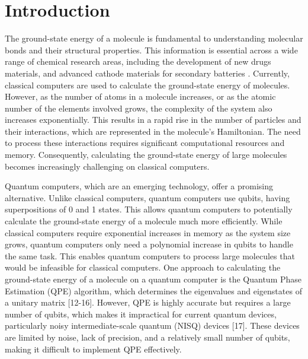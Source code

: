 \documentclass[pdflatex,sn-mathphys-num]{sn-jnl}%
\theoremstyle{thmstyleone}%
\theoremstyle{thmstyletwo}%
\theoremstyle{thmstylethree}%
\begin{document}
\section{Introduction}\label{sec1}
\cite{RN50,RN48,RN47}
The ground-state energy of a molecule is fundamental to understanding molecular bonds and their structural properties. 
This information is essential across a wide range of chemical research areas, including the development of new drugs materials\cite{RN66,RN69}, and advanced cathode materials for secondary batteries \cite{RN117,RN118,RN75}. 
Currently, classical computers are used to calculate the ground-state energy of molecules.
However, as the number of atoms in a molecule increases, or as the atomic number of the elements involved grows, the complexity of the system also increases exponentially.
This results in a rapid rise in the number of particles and their interactions, which are represented in the molecule’s Hamiltonian. 
The need to process these interactions requires significant computational resources and memory. 
Consequently, calculating the ground-state energy of large molecules becomes increasingly challenging on classical computers.

Quantum computers, which are an emerging technology, offer a promising alternative. Unlike classical computers, quantum computers use qubits, having superpositions of  0 and 1 states. 
This allows quantum computers to potentially calculate the ground-state energy of a molecule much more efficiently. 
While classical computers require exponential increases in memory as the system size grows, quantum computers only need a polynomial increase in qubits to handle the same task. 
This enables quantum computers to process large molecules that would be infeasible for classical computers.
One approach to calculating the ground-state energy of a molecule on a quantum computer is the Quantum Phase Estimation (QPE) algorithm, which determines the eigenvalues and eigenstates of a unitary matrix [12-16]. 
However, QPE is highly accurate but requires a large number of qubits, which makes it impractical for current quantum devices, particularly noisy intermediate-scale quantum (NISQ) devices [17]. 
These devices are limited by noise, lack of precision, and a relatively small number of qubits, making it difficult to implement QPE effectively.
\end{document}
